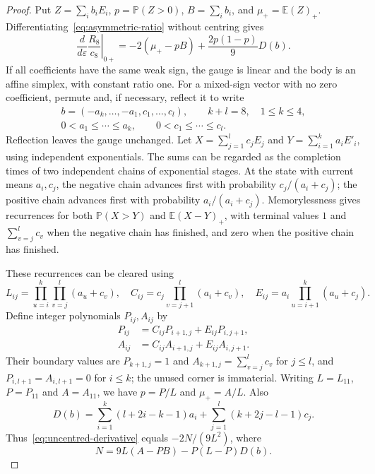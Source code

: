\documentclass[11pt,a4paper]{article}
\newcommand{\E}{\mathbb E}
\newcommand{\PP}{\mathbb P}
\begin{document}
\begin{proof}
Put $Z=\sum_i b_iE_i$, $p=\PP(Z>0)$, $B=\sum_i b_i$, and
$\mu_+=\E(Z)_+$. Differentiating~\eqref{eq:asymmetric-ratio} without
centring gives
\begin{equation}\label{eq:uncentred-derivative}
 \left.\frac{d}{d\varepsilon}\frac{R_8}{c_8}\right|_{0+}
 =-2(\mu_+-pB)+\frac{2p(1-p)}9D(b).
\end{equation}
If all coefficients have the same weak sign, the gauge is linear and
the body is an affine simplex, with constant ratio one. For a mixed-sign
vector with no zero coefficient, permute and, if necessary, reflect it
to write
\[
 \begin{gathered}
 b=(-a_k,\ldots,-a_1,c_1,\ldots,c_l),\qquad k+l=8,\quad1\le k\le4,\\
 0<a_1\le\cdots\le a_k,\qquad0<c_1\le\cdots\le c_l.
 \end{gathered}
\]
Reflection leaves the gauge unchanged. Let
$X=\sum_{j=1}^l c_jE_j$ and $Y=\sum_{i=1}^k a_iE'_i$, using independent
exponentials. The sums can be regarded as the completion times of two
independent chains of exponential stages. At the state with current
means $a_i,c_j$, the negative chain advances first with probability
$c_j/(a_i+c_j)$; the positive chain advances first with probability
$a_i/(a_i+c_j)$. Memorylessness gives recurrences for both
$\PP(X>Y)$ and $\E(X-Y)_+$, with terminal values $1$ and
$\sum_{v=j}^l c_v$ when the negative chain has finished, and zero
when the positive chain has finished.

These recurrences can be cleared using
\[
 L_{ij}=\prod_{u=i}^k\prod_{v=j}^l(a_u+c_v),\quad
 C_{ij}=c_j\prod_{v=j+1}^l(a_i+c_v),\quad
 E_{ij}=a_i\prod_{u=i+1}^k(a_u+c_j).
\]
Define integer polynomials $P_{ij},A_{ij}$ by
\[
 \begin{aligned}
 P_{ij}&=C_{ij}P_{i+1,j}+E_{ij}P_{i,j+1},\\
 A_{ij}&=C_{ij}A_{i+1,j}+E_{ij}A_{i,j+1}.
 \end{aligned}
\]
Their boundary values are $P_{k+1,j}=1$ and
$A_{k+1,j}=\sum_{v=j}^l c_v$ for $j\le l$, and
$P_{i,l+1}=A_{i,l+1}=0$ for $i\le k$; the unused corner is immaterial.
Writing $L=L_{11}$, $P=P_{11}$ and $A=A_{11}$, we have
$p=P/L$ and $\mu_+=A/L$. Also
\[
 D(b)=\sum_{i=1}^k(l+2i-k-1)a_i
       +\sum_{j=1}^l(k+2j-l-1)c_j.
\]
Thus~\eqref{eq:uncentred-derivative} equals $-2N/(9L^2)$, where
\begin{equation}\label{eq:all-cuts-polynomial}
 N=9L(A-PB)-P(L-P)D(b).
\end{equation}


\end{proof}
\end{document}
